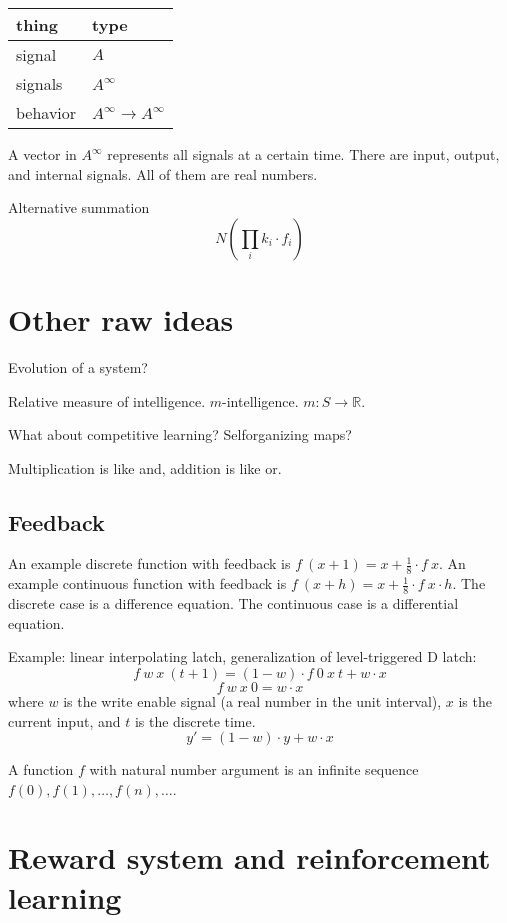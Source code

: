 \begin{center}
    \begin{tabular}{ll}
        thing & type
        \\
        \hline
        signal & \(A\)
        \\
        signals & \(A^\infty\)
        \\
        behavior & \(A^\infty \to A^\infty\)
    \end{tabular}
\end{center}

A vector in \(A^\infty\) represents all signals at a certain time.
There are input, output, and internal signals.
All of them are real numbers.

Alternative summation
\[
    N \left( \prod_i k_i \cdot f_i \right)
\]

\section{Other raw ideas}

Evolution of a system?

Relative measure of intelligence.
\(m\)-intelligence.
\(m : S \to \mathbb{R}\).

What about competitive learning? Selforganizing maps?

Multiplication is like and, addition is like or.

\subsection{Feedback}

An example discrete function with feedback is
\( f~(x+1) = x + \frac{1}{8} \cdot f~x \).
An example continuous function with feedback is
\( f~(x+h) = x + \frac{1}{8} \cdot f~x \cdot h \).
The discrete case is a difference equation.
The continuous case is a differential equation.

Example: linear interpolating latch,
generalization of level-triggered D latch:
\[
    f~w~x~(t+1) = (1 - w) \cdot f~0~x~t + w \cdot x
\]
\[
    f~w~x~0 = w \cdot x
\]
where \(w\) is the write enable signal
(a real number in the unit interval),
\(x\) is the current input,
and \(t\) is the discrete time.
\[
    y' = (1 - w) \cdot y + w \cdot x
\]

A function \(f\) with natural number argument
is an infinite sequence \(f(0), f(1), \ldots, f(n), \ldots\).

\section{Reward system and reinforcement learning}

